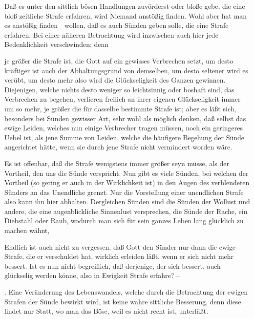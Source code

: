 \begin{aufza}
\begin{aufzb}
\item Daß es unter den sittlich bösen Handlungen zuvörderst  oder bloße  gebe, die eine bloß zeitliche Strafe erfahren, wird Niemand anstößig finden. Wohl aber hat man es anstößig finden~\ wollen, daß es auch Sünden geben solle, die eine  Strafe erfahren. Bei einer näheren Betrachtung wird inzwischen auch hier jede Bedenklichkeit verschwinden; denn
\end{aufzb}
\begin{aufzb}
\item je größer die Strafe ist, die Gott auf ein gewisses Verbrechen setzt, um desto kräftiger ist auch der Abhaltungsgrund von demselben, um desto seltener wird es verübt, um desto mehr also wird die Glückseligkeit des Ganzen gewinnen. Diejenigen, welche nichts desto weniger so leichtsinnig oder boshaft sind, das Verbrechen zu begehen, verlieren freilich an ihrer eigenen Glückseligkeit immer um so mehr, je größer die für dasselbe bestimmte Strafe ist; aber es läßt sich, besonders bei Sünden gewisser Art, sehr wohl als möglich denken, daß selbst das ewige Leiden, welches nun einige Verbrecher tragen müssen, noch ein geringeres Uebel ist, als jene Summe von Leiden, welche die häufigere Begehung der Sünde angerichtet hätte, wenn sie durch jene Strafe nicht vermindert worden wäre.
\item Es ist offenbar, daß die Strafe wenigstens immer größer seyn müsse, als der Vortheil, den uns die Sünde verspricht. Nun gibt es viele Sünden, bei welchen der Vortheil (so gering er auch in der Wirklichkeit ist) in den Augen des verblendeten Sünders an das Unendliche grenzt. Nur die Vorstellung einer unendlichen Strafe also kann ihn hier abhalten. Dergleichen Sünden sind die Sünden der Wollust und andere, die eine augenblickliche Sinnenlust versprechen, die Sünde der Rache, ein Diebstahl oder Raub, wodurch man sich für sein ganzes Leben lang glücklich zu machen wähnt, \udgl\ 
\item Endlich ist auch nicht zu vergessen, daß Gott den Sünder nur dann die ewige Strafe, die er verschuldet hat, wirklich erleiden läßt, wenn er sich nicht mehr bessert. Ist es nun nicht begreiflich, daß derjenige, der sich  bessert, auch  glückselig werden könne, also in Ewigkeit Strafe erfahre? --
\begin{aufzc} 
\item {}. Eine Veränderung des Lebenswandels, welche durch die Betrachtung der ewigen Strafen der Sünde bewirkt wird, ist keine wahre sittliche Besserung, denn diese findet nur Statt, wo man das Böse, weil es nicht recht ist, unterläßt.~\par

\end{aufzc}
\end{aufzb}
\end{aufza}
